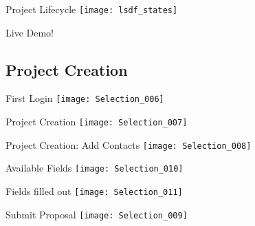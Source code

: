 \begin{frame}[c]{Project Lifecycle}
    \texttt{[image: lsdf\_states]}
\end{frame}



\addtocounter{framenumber}{1}
\begin{frame}[standout]
    \Huge
    Live Demo!
\end{frame}

\subsection{Project Creation}

\begin{frame}[c]{First Login}
    \texttt{[image: Selection\_006]}
\end{frame}

\begin{frame}[c]{Project Creation}
    \texttt{[image: Selection\_007]}
\end{frame}

\begin{frame}[c]{Project Creation: Add Contacts}
    \texttt{[image: Selection\_008]}
\end{frame}

\begin{frame}[c]{Available Fields}
    \texttt{[image: Selection\_010]}
\end{frame}

\begin{frame}[c]{Fields filled out}
    \texttt{[image: Selection\_011]}
\end{frame}

\begin{frame}[c]{Submit Proposal}
    \texttt{[image: Selection\_009]}
\end{frame}

